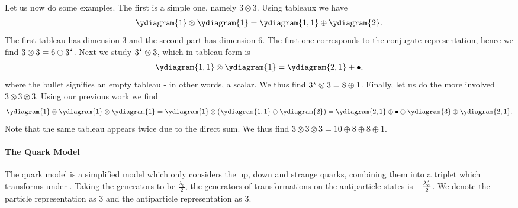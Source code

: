 Let us now do some examples. The first is a simple one, namely $3\otimes 3$. Using tableaux we have
\begin{align*}
	\ydiagram{1} \otimes \ydiagram{1} = \ydiagram{1, 1} \oplus \ydiagram{2}.
\end{align*}
The first tableau has dimension $3$ and the second part has dimension $6$. The first one corresponds to the conjugate representation, hence we find $3\otimes 3 = 6 \oplus 3^{\star}$. Next we study $3^{\star}\otimes 3$, which in tableau form is
\begin{align*}
	\ydiagram{1, 1} \otimes \ydiagram{1} = \ydiagram{2, 1} + \bullet,
\end{align*}
where the bullet signifies an empty tableau - in other words, a scalar. We thus find $3^{\star}\otimes 3 = 8\oplus 1$. Finally, let us do the more involved $3\otimes 3 \otimes 3$. Using our previous work we find
\begin{align*}
	\ydiagram{1} \otimes \ydiagram{1} \otimes \ydiagram{1} = \ydiagram{1} \otimes \left(\ydiagram{1, 1} \oplus \ydiagram{2}\right) = \ydiagram{2, 1} \oplus \bullet \oplus \ydiagram{3} \oplus \ydiagram{2, 1}.
\end{align*}
Note that the same tableau appears twice due to the direct sum. We thus find $3\otimes 3 \otimes 3 = 10 \oplus 8 \oplus 8 \oplus 1$.

\paragraph{The Quark Model}
The quark model is a simplified model which only considers the up, down and strange quarks, combining them into a triplet which transforms under . Taking the generators to be $\frac{\lambda_{a}}{2}$, the generators of transformations on the antiparticle states is $-\frac{\lambda_{a}^{\star}}{2}$. We denote the particle representation as $3$ and the antiparticle representation as $\bar{3}$.
